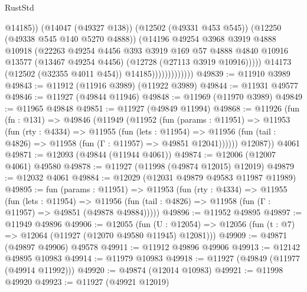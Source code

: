 \begin{lexlean}{RustStd}
\begin{coremodule}
                                    @14185))
                                (@14047 (@49327 @138))
                                (@12502 (@49331 @453 @545))
                                (@12250 (@49338 @545 @140 @5270 @4888))
                                (@14196
                                  @49254
                                  @3968
                                  @3919
                                  @4888
                                  @10918
                                  (@22263
                                    @49254
                                    @4456
                                    @393
                                    @3919
                                    @169
                                    @57
                                    @4888
                                    @4840
                                    @10916
                                    @13577
                                    (@13467 @49254 @4456)
                                    (@12728 (@27113 @3919 @10916)))))
                              @14173
                              (@12502 (@32355 @4011 @454))
                              @14185)))))))))))))
@49839 := @11910 @3989
@49843 := @11912 (@11916 @3989) (@11922 @3989)
@49844 := @11931 @49577
@49846 := @11927 (@49844 @11946)
@49848 := @11969 (@11970 @3989)
@49849 := @11965 @49848
@49851 := @11927 (@49849 @11994)
@49868 := @11926
    (fun (fn : @131) =>
    @49846
      (@11949
        (@11952
          (fun (params : @11951) =>
          @11953
            (fun (rty : @4334) =>
            @11955
              (fun (lets : @11954) =>
              @11956 (fun (tail : @4826) => @11958 (fun (Γ : @11957) => @49851 @12041))))))
        @12087))
    @4061
@49871 := @12093 (@49844 (@11944 @4061))
@49874 := @12006 (@12007 @4061) @49580
@49878 := @11927 (@11998 (@49874 @12015) @12019)
@49879 := @12032 @4061
@49884 := @12029 (@12031 @49879 @49583 @11987 @11989)
@49895 := fun (params : @11951) =>
  @11953
    (fun (rty : @4334) =>
    @11955
      (fun (lets : @11954) =>
      @11956 (fun (tail : @4826) => @11958 (fun (Γ : @11957) => @49851 (@49878 @49884)))))
@49896 := @11952 @49895
@49897 := @11949 @49896
@49906 := @12055
    (fun (U : @12054) => @12056 (fun (t : @7) => @12064 (@11927 (@12070 @49580 @11945) @12081)))
@49909 := @49871 (@49897 @49906) @49578
@49911 := @11912 @49896 @49906
@49913 := @12142 @49895 @10983
@49914 := @11979 @10983
@49918 := @11927 (@49849 (@11977 (@49914 @11992)))
@49920 := @49874 (@12014 @10983)
@49921 := @11998 @49920
@49923 := @11927 (@49921 @12019)

\end{coremodule}
\end{lexlean}

